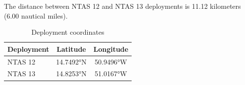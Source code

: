 
The distance between NTAS 12 and NTAS 13 deployments is 11.12 kilometers (6.00 nautical miles).

\begin{table}[ht]
\centering
\caption{Deployment coordinates}
\begin{tabular}{lcc}
\hline
\textbf{Deployment} & \textbf{Latitude} & \textbf{Longitude} \\
\hline
NTAS 12 & 14.7492°N & 50.9496°W \\
NTAS 13 & 14.8253°N & 51.0167°W \\
\hline
\end{tabular}
\end{table}
